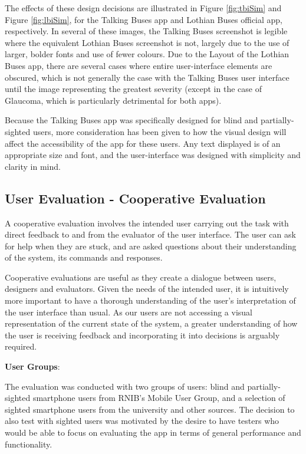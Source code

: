 \documentclass[10pt,twocolumn]{article}
\begin{document}
The effects of these design decisions are illustrated in Figure \ref{fig:tbiSim} and Figure \ref{fig:lbiSim}, for the Talking Buses app and Lothian Buses official app, respectively. In several of these images, the Talking Buses screenshot is legible where the equivalent Lothian Buses screenshot is not, largely due to the use of larger, bolder fonts and use of fewer colours. Due to the Layout of the Lothian Buses app, there are several cases where entire user-interface elements are obscured, which is not generally the case with the Talking Buses user interface until the image representing the greatest severity (except in the case of Glaucoma, which is particularly detrimental for both apps).

Because the Talking Buses app was specifically designed for blind and partially-sighted users, more consideration has been given to how the visual design will affect the accessibility of the app for these users. Any text displayed is of an appropriate size and font, and the user-interface was designed with simplicity and clarity in mind.

\subsection{User Evaluation - Cooperative Evaluation}
\label{sec:coopEval}
A cooperative evaluation involves the intended user carrying out the task with direct feedback to and from the evaluator of the user interface. The user can ask for help when they are stuck, and are asked questions about their understanding of the system, its commands and responses.

Cooperative evaluations are useful as they create a dialogue between users, designers and evaluators. Given the needs of the intended user, it is intuitively more important to have a thorough understanding of the user's interpretation of the user interface than usual. As our users are not accessing a visual representation of the current state of the system, a greater understanding of how the user is receiving feedback and incorporating it into decisions is arguably required. 

\textbf{User Groups}:

The evaluation was conducted with two groups of users: blind and partially-sighted smartphone users from RNIB's Mobile User Group, and a selection of sighted smartphone users from the university and other sources. The decision to also test with sighted users was motivated by the desire to have testers who would be able to focus on evaluating the app in terms of general performance and functionality.
\end{document}
